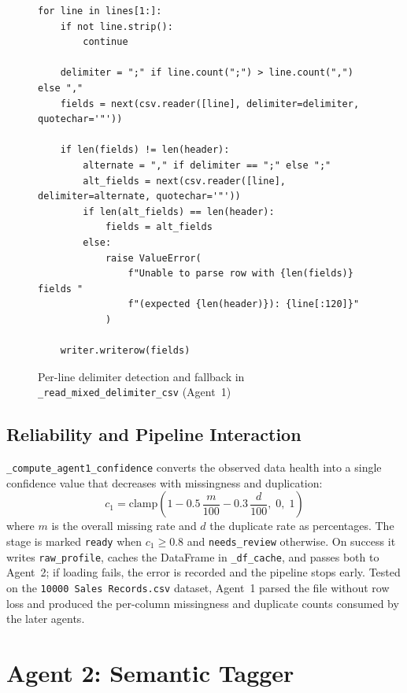 \documentclass[12pt,a4paper,openany]{report}
\begin{document}
\begin{figure}[H]
\centering
\begin{lstlisting}[style=pystyle]
for line in lines[1:]:
    if not line.strip():
        continue

    delimiter = ";" if line.count(";") > line.count(",") else ","
    fields = next(csv.reader([line], delimiter=delimiter, quotechar='"'))

    if len(fields) != len(header):
        alternate = "," if delimiter == ";" else ";"
        alt_fields = next(csv.reader([line], delimiter=alternate, quotechar='"'))
        if len(alt_fields) == len(header):
            fields = alt_fields
        else:
            raise ValueError(
                f"Unable to parse row with {len(fields)} fields "
                f"(expected {len(header)}): {line[:120]}"
            )

    writer.writerow(fields)
\end{lstlisting}
\caption{Per-line delimiter detection and fallback in \texttt{\_read\_mixed\_delimiter\_csv} (Agent~1)}
\label{fig:code-agent1-csv}
\end{figure}

\subsection{Reliability and Pipeline Interaction}
\texttt{\_compute\_agent1\_confidence} converts the observed data health into a single confidence value that decreases with missingness and duplication:
\begin{equation}
c_1 = \text{clamp}\!\left(1 - 0.5\,\frac{m}{100} - 0.3\,\frac{d}{100},\; 0,\; 1\right)
\label{eq:agent1-conf}
\end{equation}
where $m$ is the overall missing rate and $d$ the duplicate rate as percentages. The stage is marked \texttt{ready} when $c_1 \geq 0.8$ and \texttt{needs\_review} otherwise. On success it writes \texttt{raw\_profile}, caches the DataFrame in \texttt{\_df\_cache}, and passes both to Agent~2; if loading fails, the error is recorded and the pipeline stops early. Tested on the \texttt{10000 Sales Records.csv} dataset, Agent~1 parsed the file without row loss and produced the per-column missingness and duplicate counts consumed by the later agents.

\section{Agent 2: Semantic Tagger}
\end{document}
